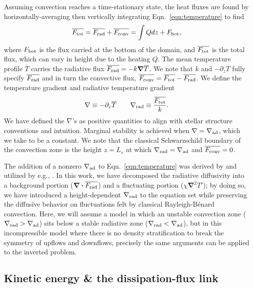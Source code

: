 \documentclass[twocolumn, linenumbers]{aastex631}
\newcommand{\gradrad}{\ensuremath{\nabla_{\rm{rad}}}}
\newcommand{\gradad}{\ensuremath{\nabla_{\rm{ad}}}}
\newcommand{\justgrad}{\ensuremath{\nabla}}
\newcommand{\Fbot}{\ensuremath{F_{\rm{bot}}}}
\newcommand{\Ftot}{\ensuremath{F_{\rm{tot}}}}
\newcommand{\Frad}{\ensuremath{F_{\rm{rad}}}}
\newcommand{\Fconv}{\ensuremath{F_{\rm{conv}}}}
\renewcommand{\vec}[1]{\boldsymbol{#1}}
\renewcommand{\dot}{\vec{\cdot}}
\renewcommand{\bar}[1]{\overline{#1}}
\newcommand{\grad}{\vec{\nabla}}
\begin{document}
Assuming convection reaches a time-stationary state, the heat fluxes are found by horizontally-averaging then vertically integrating Eqn.~\ref{eqn:temperature} to find
\begin{equation}
\overline{\Ftot} = \overline{\Frad} + \overline{\Fconv} = \int Q dz + \Fbot,
\label{eqn:flux_definition}
\end{equation}
where $\Fbot$ is the flux carried at the bottom of the domain, and $\overline{\Ftot}$ is the total flux, which can vary in height due to the heating $Q$.
The mean temperature profile $\overline{T}$ carries the radiative flux $\bar{\Frad} = -k \grad \overline{T}$.
We note that $k$ and $-\partial_z \bar{T}$ fully specify $\bar{\Frad}$ and in turn the convective flux, $\bar{\Fconv} = \bar{\Ftot} - \bar{\Frad}$.
We define the temperature gradient and radiative temperature gradient 
\begin{equation}
\justgrad \equiv -\partial_z \bar{T} \qquad
\gradrad \equiv \frac{\bar{\Ftot}}{k}.
\label{eqn:gradrad_definition}
\end{equation}
We have defined the $\justgrad$'s as positive quantities to align with stellar structure conventions and intuition.
Marginal stability is achieved when $\justgrad = \gradad$, which we take to be a constant.
We note that the classical Schwarzschild boundary of the convection zone is the height $z = L_s$ at which $\gradrad = \gradad$ and $\bar{\Fconv} = 0$.

The addition of a nonzero $\gradad$ to Eqn.~\ref{eqn:temperature} was derived by \citet{spiegel_veronis_1960} and utilized by e.g., \citet{korre_etal_2019}.
In this work, we have decomposed the radiative diffusivity into a background portion ($\grad\dot \bar{\Frad}$) and a fluctuating portion ($\chi \grad^2 T'$); by doing so, we have introduced a height-dependent $\gradrad$ to the equation set while preserving the diffusive behavior on fluctuations felt by classical Rayleigh-B\'{e}nard convection.
Here, we will assume a model in which an unstable convection zone ($\gradrad > \gradad$) sits below a stable radiative zone ($\gradrad < \gradad$), but in this incompressible model where there is no density stratification to break the symmetry of upflows and downflows, precisely the same arguments can be applied to the inverted problem.

\subsection{Kinetic energy \& the dissipation-flux link}
\label{sec:theory_energy}
\end{document}
